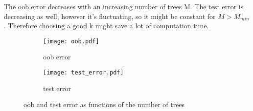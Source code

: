 \documentclass[a4paper,11pt]{article}
\theoremstyle{definition}
\theoremstyle{plain}
\theoremstyle{remark}
\begin{document}
The oob error decreases with an increasing number of trees M. The test error is decreasing as well, however it's fluctuating, so it might be constant for $M > M_{min}$. Therefore choosing a good k might save a lot of computation time.
\begin{figure}[H]
\centering
\begin{subfigure}{0.49\textwidth}
\texttt{[image: oob.pdf]}
\caption{oob error}
\end{subfigure}
\hfill
\begin{subfigure}{0.49\textwidth}
\texttt{[image: test\_error.pdf]}
\caption{test error}
\end{subfigure}
\caption{oob and test error as functions of the number of trees}
\end{figure}
\end{document}

